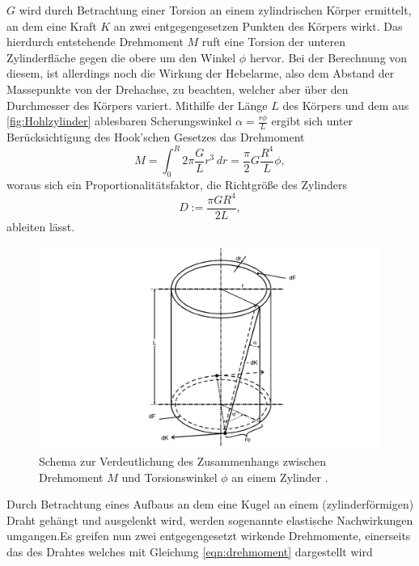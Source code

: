     $G$ wird durch Betrachtung einer Torsion an einem zylindrischen Körper ermittelt, an dem eine Kraft $K$ an zwei entgegengesetzen 
    Punkten des Körpers wirkt.  
    Das hierdurch entstehende Drehmoment $M$ ruft eine Torsion der unteren Zylinderfläche gegen die obere um den Winkel $\phi$ hervor.
    Bei der Berechnung von diesem, ist allerdings noch die Wirkung der Hebelarme, also dem Abstand der Massepunkte von der Drehachse,
    zu beachten, welcher aber über den Durchmesser des Körpers variert. 
    Mithilfe der Länge $L$ des Körpers und dem aus \autoref{fig:Hohlzylinder} ablesbaren Scherungswinkel $\alpha = \frac{r \phi}{L}$
    ergibt sich unter Berücksichtigung des Hook'schen Gesetzes das Drehmoment
    \begin{equation}
    \label{eqn:drehmoment}
    M = \int_0^{R} 2 \pi \frac{G}{L} r^3 \, dr = \frac {\pi}{2} G \frac {R^4}{L} \phi,
    \end{equation}
    woraus sich ein Proportionalitätsfaktor, die Richtgröße des Zylinders 
    \begin{equation}
    \label{eqn:richtgroesse}
    D := \frac{\pi G R^4}{2L},
    \end{equation}
    ableiten lässt.
    \begin{figure}
        \centering
        \includegraphics[width=\textwidth]{content/hohlzylinder.png}
        \caption{Schema zur Verdeutlichung des Zusammenhangs zwischen Drehmoment $M$ und Torsionswinkel $\phi$ an einem Zylinder \cite[97]{V102}.}
        \label{fig:Hohlzylinder}
    \end{figure}
    Durch Betrachtung eines Aufbaus an dem eine Kugel an einem (zylinderförmigen) Draht gehängt und ausgelenkt wird, werden sogenannte
    elastische Nachwirkungen umgangen.Es greifen nun zwei entgegengesetzt wirkende Drehmomente,
    einerseits das des Drahtes welches mit Gleichung \eqref{eqn:drehmoment} dargestellt wird
